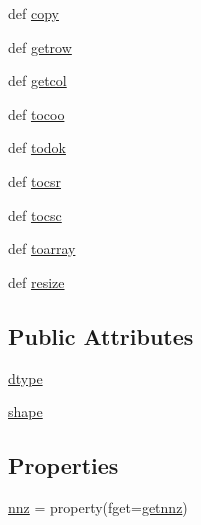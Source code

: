 \begin{DoxyCompactItemize}
def \hyperlink{classscipy_1_1sparse_1_1dok_1_1dok__matrix_a0e1154f2df5e284d382eb88c814da49b}{copy}
\item 
def \hyperlink{classscipy_1_1sparse_1_1dok_1_1dok__matrix_a1d12075dcf5cac3171894733be71eafc}{getrow}
\item 
def \hyperlink{classscipy_1_1sparse_1_1dok_1_1dok__matrix_a430f0c73ded06ba1ec87b42d79127ccd}{getcol}
\item 
def \hyperlink{classscipy_1_1sparse_1_1dok_1_1dok__matrix_ab2703dcdf563c6b86ba896ae43cac6e7}{tocoo}
\item 
def \hyperlink{classscipy_1_1sparse_1_1dok_1_1dok__matrix_a4374dffea5119c1b074433f565519bab}{todok}
\item 
def \hyperlink{classscipy_1_1sparse_1_1dok_1_1dok__matrix_a75fd56b61759e5b344a3a171cd35d587}{tocsr}
\item 
def \hyperlink{classscipy_1_1sparse_1_1dok_1_1dok__matrix_a2797ea79eae210ca1bfd5cbb826d5f5e}{tocsc}
\item 
def \hyperlink{classscipy_1_1sparse_1_1dok_1_1dok__matrix_a2cd6f33f11e1cf4c0c0f3f1e48fd88b7}{toarray}
\item 
def \hyperlink{classscipy_1_1sparse_1_1dok_1_1dok__matrix_ae2a8a5ac3368a6e0906038b8d665eac3}{resize}
\end{DoxyCompactItemize}
\subsection*{Public Attributes}
\begin{DoxyCompactItemize}
\item 
\hyperlink{classscipy_1_1sparse_1_1dok_1_1dok__matrix_a4b3ea9de9e442bb8debb28a065dff6ac}{dtype}
\item 
\hyperlink{classscipy_1_1sparse_1_1dok_1_1dok__matrix_aeb70af3ad203d45144e6b7ee53fb0da7}{shape}
\end{DoxyCompactItemize}
\subsection*{Properties}
\begin{DoxyCompactItemize}
\item 
\hyperlink{classscipy_1_1sparse_1_1dok_1_1dok__matrix_a4ab565e1e7a985b0a955e624fba42c85}{nnz} = property(fget=\hyperlink{classscipy_1_1sparse_1_1dok_1_1dok__matrix_a17e3c30cd530ec52f6e79cf703de6e5f}{getnnz})
\end{DoxyCompactItemize}


